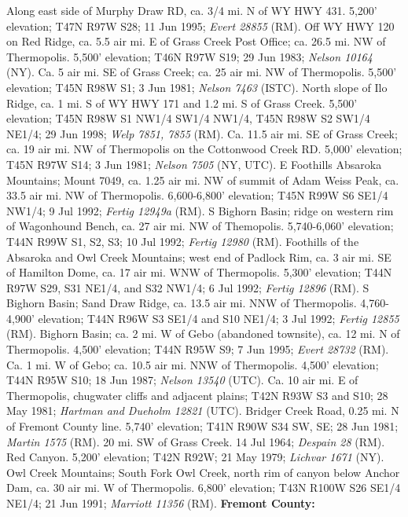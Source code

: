 Along east side of Murphy Draw RD, ca. 3/4 mi. N of WY HWY 431.
5,200' elevation; T47N R97W S28; 11 Jun 1995; \textit{Evert 28855} (RM).
Off WY HWY 120 on Red Ridge, ca. 5.5 air mi. E of Grass Creek Post Office;
ca. 26.5 mi. NW of Thermopolis. 5,500' elevation; T46N R97W S19; 29 Jun 1983;
\textit{Nelson 10164} (NY).
Ca. 5 air mi. SE of Grass Creek; ca. 25 air mi. NW of Thermopolis.
5,500' elevation; T45N R98W S1; 3 Jun 1981; \textit{Nelson 7463} (ISTC).
North slope of Ilo Ridge, ca. 1 mi. S of WY HWY 171 and 1.2 mi.
S of Grass Creek.	5,500' elevation; T45N R98W S1 NW1/4 SW1/4 NW1/4,
T45N R98W S2 SW1/4 NE1/4; 29 Jun 1998; \textit{Welp 7851, 7855} (RM).
Ca. 11.5 air mi. SE of Grass Creek; ca. 19 air mi. NW of
Thermopolis on the Cottonwood Creek RD. 5,000' elevation; T45N R97W S14;
3 Jun 1981; \textit{Nelson 7505} (NY, UTC).
E Foothills Absaroka Mountains; Mount 7049, ca. 1.25 air mi. NW of summit of
Adam Weiss Peak, ca. 33.5 air mi. NW of Thermopolis. 6,600-6,800' elevation;
T45N R99W S6 SE1/4 NW1/4; 9 Jul 1992; \textit{Fertig 12949a} (RM).
S Bighorn Basin; ridge on western rim of Wagonhound Bench, ca. 27 air mi. NW of
Themopolis. 5,740-6,060' elevation; T44N R99W S1, S2, S3; 10 Jul 1992;
\textit{Fertig 12980} (RM).
Foothills of the Absaroka and Owl Creek Mountains; west end of Padlock Rim, ca.
3 air mi. SE of Hamilton Dome, ca. 17 air mi. WNW of Thermopolis.
5,300' elevation; T44N R97W S29, S31 NE1/4, and S32 NW1/4; 6 Jul 1992;
\textit{Fertig 12896} (RM).
S Bighorn Basin; Sand Draw Ridge, ca. 13.5 air mi. NNW of Thermopolis.
4,760-4,900' elevation; T44N R96W S3 SE1/4 and S10 NE1/4; 3 Jul 1992;
\textit{Fertig 12855} (RM).
Bighorn Basin; ca. 2 mi. W of Gebo (abandoned townsite), ca. 12 mi. N of
Thermopolis. 4,500' elevation; T44N R95W S9; 7 Jun 1995;
\textit{Evert 28732} (RM).
Ca. 1 mi. W of Gebo; ca. 10.5 air mi. NNW of Thermopolis. 4,500' elevation;
T44N R95W S10; 18 Jun 1987; \textit{Nelson 13540} (UTC).
Ca. 10 air mi. E of Thermopolis, chugwater cliffs and adjacent plains;
T42N R93W S3 and S10; 28 May 1981; \textit{Hartman and Dueholm 12821} (UTC).
Bridger Creek Road, 0.25 mi. N of Fremont County line. 5,740' elevation;
T41N R90W S34 SW, SE; 	28 Jun 1981; \textit{Martin 1575} (RM).
20 mi. SW of Grass Creek. 14 Jul 1964; \textit{Despain 28} (RM).
Red Canyon. 5,200' elevation; T42N R92W; 21 May 1979; \textit{Lichvar 1671} (NY).
Owl Creek Mountains; South Fork Owl Creek, north rim of canyon below Anchor Dam,
ca. 30 air mi. W of Thermopolis. 6,800' elevation; T43N R100W S26	SE1/4 NE1/4;
21 Jun 1991; \textit{Marriott 11356} (RM).
  \textbf{Fremont County:}
